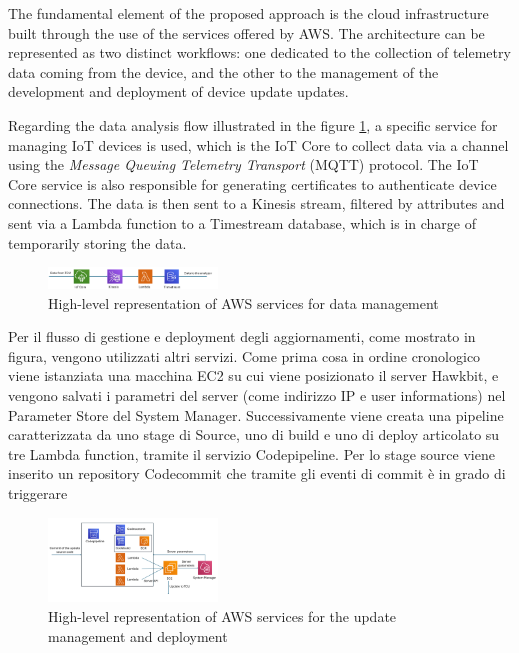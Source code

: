 \documentclass[10pt,a4paper,roman, twocolumn]{article}
\begin{document}
The fundamental element of the proposed approach is the cloud infrastructure built through the use of the services offered by AWS. The architecture can be represented as two distinct workflows: one dedicated to the collection of telemetry data coming from the device, and the other to the management of the development and deployment of device update updates.

Regarding the data analysis flow illustrated in the figure \ref{fig:AWSDataServices}, a specific service for managing IoT devices is used, which is the IoT Core to collect data via a channel using the \textit{Message Queuing Telemetry Transport} (MQTT) protocol. The IoT Core service is also responsible for generating certificates to authenticate device connections. The data is then sent to a Kinesis stream, filtered by attributes and sent via a Lambda function to a Timestream database, which is in charge of temporarily storing the data.
\begin{figure} [tbh]
	\centerline{\includegraphics[width=0.4\textwidth]{images/AWS_data_services.png}}
	\caption{High-level representation of AWS services for data management}
	\label{fig:AWSDataServices}
\end{figure}

Per il flusso di gestione e deployment degli aggiornamenti, come mostrato in figura, vengono utilizzati altri servizi. Come prima cosa in ordine cronologico viene istanziata una macchina EC2 su cui viene posizionato il server Hawkbit, e vengono salvati i parametri del server (come indirizzo IP e user informations) nel Parameter Store del System Manager. Successivamente viene creata una pipeline caratterizzata da uno stage di Source, uno di build e uno di deploy articolato su tre Lambda function, tramite il servizio Codepipeline. Per lo stage source viene inserito un repository Codecommit che tramite gli eventi di commit è in grado di triggerare 
\begin{figure} [tbh]
	\centerline{\includegraphics[width=0.4\textwidth]{images/AWS_update_services.png}}
	\caption{High-level representation of AWS services for the update management and deployment}
	\label{fig:AWSUpdateServices}
\end{figure}
\end{document}
